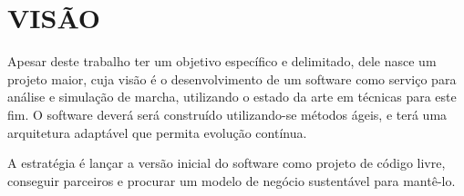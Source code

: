 \section[VISÃO]{VISÃO} 
Apesar deste trabalho ter um objetivo específico e delimitado, dele nasce um projeto maior, cuja visão é o desenvolvimento de um software como serviço para análise e simulação de marcha, utilizando o estado da arte em técnicas para este fim. 
O software deverá será construído utilizando-se métodos ágeis, e terá uma arquitetura adaptável que permita evolução contínua.

A estratégia é lançar a versão inicial do software como projeto de código livre, conseguir parceiros e procurar um modelo de negócio sustentável para mantê-lo.
